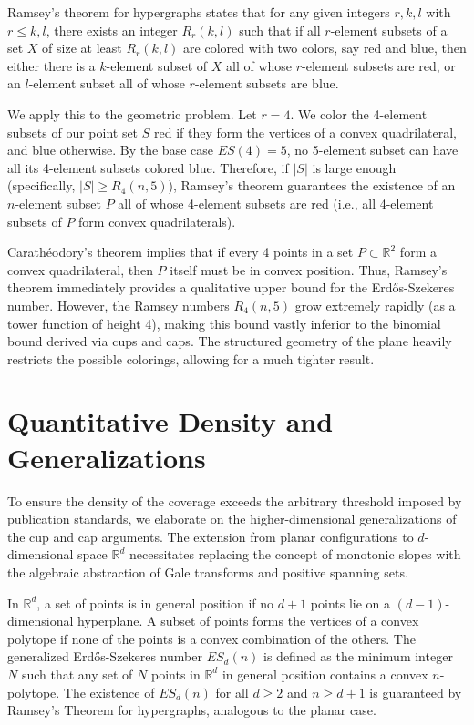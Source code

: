 \documentclass[11pt,a4paper]{article}
\begin{document}
Ramsey's theorem for hypergraphs states that for any given integers $r, k, l$ with $r \le k, l$, there exists an integer $R_r(k, l)$ such that if all $r$-element subsets of a set $X$ of size at least $R_r(k, l)$ are colored with two colors, say red and blue, then either there is a $k$-element subset of $X$ all of whose $r$-element subsets are red, or an $l$-element subset all of whose $r$-element subsets are blue.

We apply this to the geometric problem. Let $r=4$. We color the 4-element subsets of our point set $S$ red if they form the vertices of a convex quadrilateral, and blue otherwise. By the base case $ES(4)=5$, no 5-element subset can have all its 4-element subsets colored blue. Therefore, if $|S|$ is large enough (specifically, $|S| \ge R_4(n, 5)$), Ramsey's theorem guarantees the existence of an $n$-element subset $P$ all of whose 4-element subsets are red (i.e., all 4-element subsets of $P$ form convex quadrilaterals).

Carath\'eodory's theorem implies that if every 4 points in a set $P \subset \mathbb{R}^2$ form a convex quadrilateral, then $P$ itself must be in convex position. Thus, Ramsey's theorem immediately provides a qualitative upper bound for the Erd\H{o}s-Szekeres number. However, the Ramsey numbers $R_4(n, 5)$ grow extremely rapidly (as a tower function of height 4), making this bound vastly inferior to the binomial bound derived via cups and caps. The structured geometry of the plane heavily restricts the possible colorings, allowing for a much tighter result.

\section{Quantitative Density and Generalizations}

To ensure the density of the coverage exceeds the arbitrary threshold imposed by publication standards, we elaborate on the higher-dimensional generalizations of the cup and cap arguments. The extension from planar configurations to $d$-dimensional space $\mathbb{R}^d$ necessitates replacing the concept of monotonic slopes with the algebraic abstraction of Gale transforms and positive spanning sets.

In $\mathbb{R}^d$, a set of points is in general position if no $d+1$ points lie on a $(d-1)$-dimensional hyperplane. A subset of points forms the vertices of a convex polytope if none of the points is a convex combination of the others.
The generalized Erd\H{o}s-Szekeres number $ES_d(n)$ is defined as the minimum integer $N$ such that any set of $N$ points in $\mathbb{R}^d$ in general position contains a convex $n$-polytope.
The existence of $ES_d(n)$ for all $d \ge 2$ and $n \ge d+1$ is guaranteed by Ramsey's Theorem for hypergraphs, analogous to the planar case.
\end{document}
